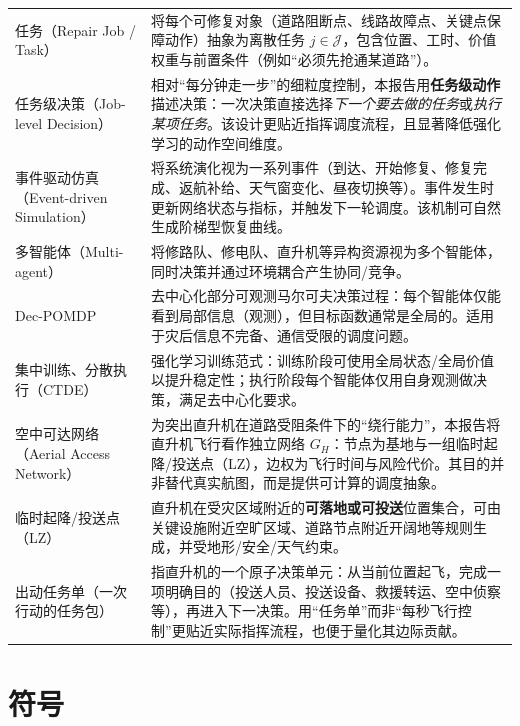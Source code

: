 \documentclass[UTF8,zihao=-4,a4paper,fontset=fandol]{ctexrep}
\begin{document}
\begin{longtable}{p{}p{}}
任务（Repair Job / Task） & 将每个可修复对象（道路阻断点、线路故障点、关键点保障动作）抽象为离散任务 $j\in\mathcal{J}$，包含位置、工时、价值权重与前置条件（例如“必须先抢通某道路”）。\\

任务级决策（Job-level Decision） & 相对“每分钟走一步”的细粒度控制，本报告用\textbf{任务级动作}描述决策：一次决策直接选择\textit{下一个要去做的任务}或\textit{执行某项任务}。该设计更贴近指挥调度流程，且显著降低强化学习的动作空间维度。\\

事件驱动仿真（Event-driven Simulation） & 将系统演化视为一系列事件（到达、开始修复、修复完成、返航补给、天气窗变化、昼夜切换等）。事件发生时更新网络状态与指标，并触发下一轮调度。该机制可自然生成阶梯型恢复曲线。\\

多智能体（Multi-agent） & 将修路队、修电队、直升机等异构资源视为多个智能体，同时决策并通过环境耦合产生协同/竞争。\\

Dec-POMDP & 去中心化部分可观测马尔可夫决策过程：每个智能体仅能看到局部信息（观测），但目标函数通常是全局的。适用于灾后信息不完备、通信受限的调度问题。\\

集中训练、分散执行（CTDE） & 强化学习训练范式：训练阶段可使用全局状态/全局价值以提升稳定性；执行阶段每个智能体仅用自身观测做决策，满足去中心化要求。\\

空中可达网络（Aerial Access Network） & 为突出直升机在道路受阻条件下的“绕行能力”，本报告将直升机飞行看作独立网络 $G_H$：节点为基地与一组临时起降/投送点（LZ），边权为飞行时间与风险代价。其目的并非替代真实航图，而是提供可计算的调度抽象。\\

临时起降/投送点（LZ） & 直升机在受灾区域附近的\textbf{可落地或可投送}位置集合，可由关键设施附近空旷区域、道路节点附近开阔地等规则生成，并受地形/安全/天气约束。\\

出动任务单（一次行动的任务包） & 指直升机的一个原子决策单元：从当前位置起飞，完成一项明确目的（投送人员、投送设备、救援转运、空中侦察等），再进入下一决策。用“任务单”而非“每秒飞行控制”更贴近实际指挥流程，也便于量化其边际贡献。\\
\end{longtable}

\chapter{符号}
\end{document}
